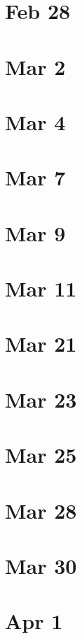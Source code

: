 \documentclass{article}
\newcommand{\<}{\langle}
\renewcommand{\>}{\rangle}
\numberwithin{equation}{section}
\theoremstyle{plain}
\theoremstyle{definition}
\theoremstyle{remark}
\begin{document}
\section*{Feb 28}

\section*{Mar 2}

\section*{Mar 4}

\section*{Mar 7}

\section*{Mar 9}

\section*{Mar 11}

\section*{Mar 21}

\section*{Mar 23}

\section*{Mar 25}

\section*{Mar 28}

\section*{Mar 30}

\section*{Apr 1}
\end{document}
